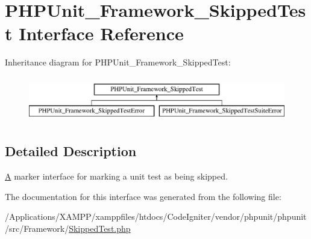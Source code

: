 \hypertarget{interface_p_h_p_unit___framework___skipped_test}{}\section{P\+H\+P\+Unit\+\_\+\+Framework\+\_\+\+Skipped\+Test Interface Reference}
\label{interface_p_h_p_unit___framework___skipped_test}
Inheritance diagram for P\+H\+P\+Unit\+\_\+\+Framework\+\_\+\+Skipped\+Test\+:\begin{figure}[H]
\begin{center}
\leavevmode
\includegraphics[height=2.000000cm]{interface_p_h_p_unit___framework___skipped_test}
\end{center}
\end{figure}


\subsection{Detailed Description}
\mbox{\hyperlink{class_a}{A}} marker interface for marking a unit test as being skipped. 

The documentation for this interface was generated from the following file\+:\begin{DoxyCompactItemize}
\item 
/\+Applications/\+X\+A\+M\+P\+P/xamppfiles/htdocs/\+Code\+Igniter/vendor/phpunit/phpunit/src/\+Framework/\mbox{\hyperlink{_skipped_test_8php}{Skipped\+Test.\+php}}\end{DoxyCompactItemize}
